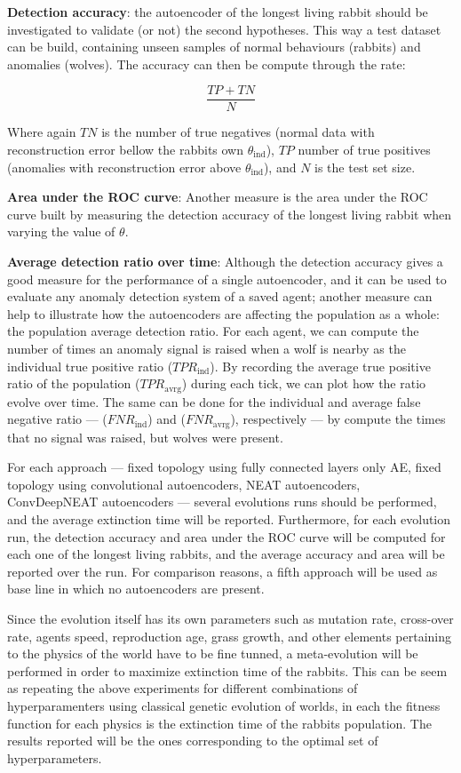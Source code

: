 \documentclass[letterpaper]{article}
\numberwithin{equation}{section}
\numberwithin{theorem}{section}
\numberwithin{lemma}{section}
\numberwithin{df}{section}
\begin{document}
\textbf{Detection accuracy}: the autoencoder of the longest living rabbit should be investigated to validate (or not) the second hypotheses. This way a test dataset can be build, containing unseen samples of normal behaviours (rabbits) and anomalies (wolves). The accuracy can then be compute through the rate:

\[\frac{TP+TN}{N}\]
 
Where again $TN$ is the number of true negatives (normal data with reconstruction error bellow the rabbits own $\theta_\text{ind}$), $TP$ number of true positives (anomalies with reconstruction error above $\theta_\text{ind}$), and $N$ is the test set size.

\textbf{Area under the ROC curve}: Another measure is the area under the ROC curve built by measuring the detection accuracy of the longest living rabbit when varying the value of $\theta$.

\textbf{Average detection ratio over time}: Although the detection accuracy gives a good measure for the performance of a single autoencoder, and it can be used to evaluate any anomaly detection system of a saved agent; another measure can help to illustrate how the autoencoders are affecting the population as a whole: the population average detection ratio. For each agent, we can compute the number of times an anomaly signal is raised when a wolf is nearby as the individual true positive ratio ($TPR_{\text{ind}}$). By recording the average true positive ratio of the population ($TPR_{\text{avrg}}$) during each tick, we can plot how the ratio evolve over time. The same can be done for the individual and average false negative ratio --- ($FNR_{\text{ind}}$) and ($FNR_{\text{avrg}}$), respectively --- by compute the times that no signal was raised, but wolves were present.

For each approach --- fixed topology using fully connected layers only AE, fixed topology using convolutional autoencoders, NEAT autoencoders, ConvDeepNEAT autoencoders --- several evolutions runs should be performed, and the average extinction time will be reported. Furthermore, for each evolution run, the detection accuracy and area under the ROC curve will be computed for each one of the longest living rabbits, and the average accuracy and area will be reported over the run. For comparison reasons, a fifth approach will be used as base line in which no autoencoders are present.

Since the evolution itself has its own parameters such as mutation rate, cross-over rate, agents speed, reproduction age, grass growth, and other elements pertaining to the physics of the world have to be fine tunned, a meta-evolution will be performed in order to maximize extinction time of the rabbits. This can be seem as repeating the above experiments for different combinations of hyperparamenters using classical genetic evolution of worlds, in each the fitness function for each physics is the extinction time of the rabbits population. The results reported will be the ones corresponding to the optimal set of hyperparameters.
 
\end{document}
